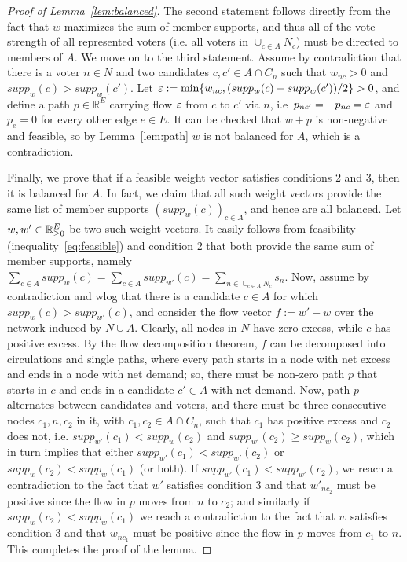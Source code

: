 \begin{proof}[Proof of Lemma~\ref{lem:balanced}]
The second statement follows directly from the fact that $w$ maximizes the sum of member supports, and thus all of the vote strength of all represented voters (i.e. all voters in $\cup_{c\in A} N_c$) must be directed to members of $A$. 
We move on to the third statement. 
Assume by contradiction that there is a voter $n\in N$ and two candidates $c, c'\in A\cap C_n$ such that $w_{nc}>0$ and $supp_w(c)>supp_w(c')$. 
Let $\varepsilon:=\min\{w_{nc}, (supp_w(c)-supp_w(c'))/2\}>0$, and define a path $p\in\mathbb{R}^E$ carrying flow $\varepsilon$ from $c$ to $c'$ via $n$, i.e~$p_{nc'}=-p_{nc}=\varepsilon$ and $p_e=0$ for every other edge $e\in E$. 
It can be checked that $w+p$ is non-negative and feasible, so by Lemma~\ref{lem:path} $w$ is not balanced for $A$, which is a contradiction. 

Finally, we prove that if a feasible weight vector satisfies conditions 2 and 3, then it is balanced for $A$. 
In fact, we claim that all such weight vectors provide the same list of member supports $(supp_w(c))_{c\in A}$, and hence are all balanced. 
Let $w, w'\in\mathbb{R}_{\geq 0}^E$ be two such weight vectors. It easily follows from feasibility (inequality~\ref{eq:feasible}) and condition 2 that both provide the same sum of member supports, namely $\sum_{c\in A} supp_w(c) = \sum_{c\in A} supp_{w'}(c) =\sum_{n\in \cup_{c\in A} N_c} s_n$. 
Now, assume by contradiction and wlog that there is a candidate $c\in A$ for which $supp_{w}(c)>supp_{w'}(c)$, and consider the flow vector $f:=w'-w$ over the network induced by $N\cup A$. Clearly, all nodes in $N$ have zero excess, while $c$ has positive excess.
By the flow decomposition theorem, $f$ can be decomposed into circulations and single paths, where every path starts in a node with net excess and ends in a node with net demand; so, there must be non-zero path $p$ that starts in $c$ and ends in a candidate $c'\in A$ with net demand. 
Now, path $p$ alternates between candidates and voters, and there must be three consecutive nodes $c_1, n, c_2$ in it, with $c_1, c_2\in A\cap C_{n}$, such that $c_1$ has positive excess and $c_2$ does not, i.e. $supp_{w'}(c_1)<supp_w(c_2)$ and $supp_{w'}(c_2)\geq supp_w(c_2)$, which in turn implies that either $supp_{w'}(c_1)<supp_{w'}(c_2)$ or $supp_w(c_2)<supp_{w}(c_1)$ (or both). 
If $supp_{w'}(c_1)<supp_{w'}(c_2)$, we reach a contradiction to the fact that $w'$ satisfies condition 3 and that $w'_{nc_2}$ must be positive since the flow in $p$ moves from $n$ to $c_2$; 
and similarly if $supp_w(c_2)<supp_{w}(c_1)$ we reach a contradiction to the fact that $w$ satisfies condition 3 and that $w_{nc_1}$ must be positive since the flow in $p$ moves from $c_1$ to $n$. This completes the proof of the lemma.
\end{proof}



